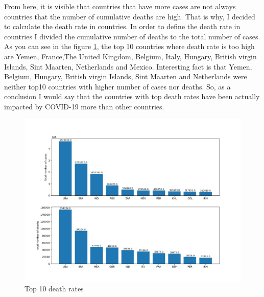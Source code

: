 \documentclass[12pt, letterpaper]{article}
\begin{document}
From here, it is visible that countries that have more cases are not always countries that the number of cumulative deaths are high. That is why, I decided to calculate the death rate in countries. In order to define the death rate in countries I divided the cumulative number of deaths to the total number of cases. As you can see in the figure \ref{fig:plot2}, the top 10 countries where death rate is too high are Yemen, France,The United Kingdom, Belgium, Italy, Hungary, British virgin Islands, Sint Maarten, Netherlands and Mexico. Interesting fact is that Yemen, Belgium, Hungary, British virgin Islands, Sint Maarten and Netherlands were neither top10 countries with higher number of cases nor deaths. So, as a conclusion I would say that the countries with top death rates have been actually impacted by COVID-19 more than other countries.
\begin{figure}[h]
    \centering
    \includegraphics[width=1\textwidth]{plot2}
    \caption{Top 10 death rates}
    \label{fig:plot2}
\end{figure}
\end{document}
